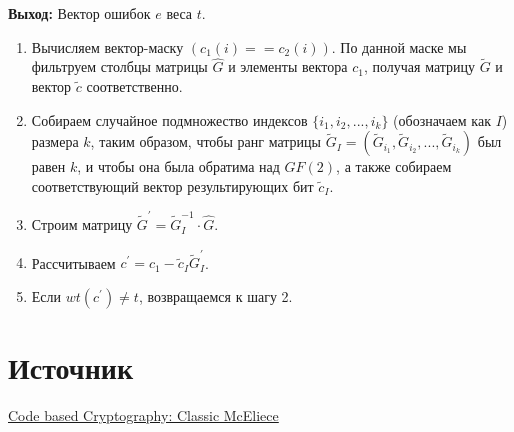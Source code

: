 \documentclass[12pt,a4paper]{scrartcl}
\begin{document}
\textbf{Выход:} Вектор ошибок $e$ веса $t$.

\begin{enumerate} 
	\item Вычисляем вектор-маску $(c_1(i) == c_2(i))$. По данной маске мы фильтруем столбцы матрицы $\hat{G}$ и элементы вектора $c_1$, получая матрицу $\widetilde{G}$ и вектор $\widetilde{c}$ соответственно.
	\item Собираем случайное подмножество индексов $\{i_1,i_2,...,i_k\}$ (обозначаем как $I$) размера $k$, таким образом, чтобы ранг матрицы $\widetilde{G}_I = (\widetilde{G}_{i_1},\widetilde{G}_{i_2},...,\widetilde{G}_{i_k})$ был равен $k$, и чтобы она была обратима над $GF(2)$, а также собираем соответствующий вектор результирующих бит $\widetilde{c}_I$.
	\item Строим матрицу $\widetilde{G}^\prime=\widetilde{G}_I^{-1} \cdot \hat{G}$. 
	\item Рассчитываем $c^\prime=c_1-\widetilde{c}_I\widetilde{G}_I^\prime$.
	\item Если $wt(c^\prime) \neq t$, возвращаемся к шагу 2.
\end{enumerate}


\section{Источник}

\href{https://arxiv.org/abs/1907.12754}{Code based Cryptography: Classic McEliece}
\end{document}
